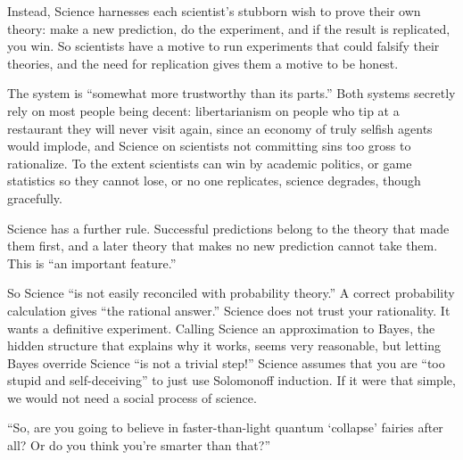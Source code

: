 Instead, Science harnesses each scientist's stubborn wish to prove their own theory: make a new prediction, do the experiment, and if the result is replicated, you win. So scientists have a motive to run experiments that could falsify their theories, and the need for replication gives them a motive to be honest. 

The system is ``somewhat more trustworthy than its parts.'' Both systems secretly rely on most people being decent: libertarianism on people who tip at a restaurant they will never visit again, since an economy of truly selfish agents would implode, and Science on scientists not committing sins too gross to rationalize. To the extent scientists can win by academic politics, or game statistics so they cannot lose, or no one replicates, science degrades, though gracefully.

Science has a further rule. Successful predictions belong to the theory that made them first, and a later theory that makes no new prediction cannot take them. This is ``an important feature.'' 

So Science ``is not easily reconciled with probability theory.'' A correct probability calculation gives ``the rational answer.'' Science does not trust your rationality. It wants a definitive experiment. Calling Science an approximation to Bayes, the hidden structure that explains why it works, seems very reasonable, but letting Bayes override Science ``is not a trivial step!'' Science assumes that you are ``too stupid and self-deceiving'' to just use Solomonoff induction. If it were that simple, we would not need a social process of science.

``So, are you going to believe in faster-than-light quantum `collapse' fairies after all? Or do you think you're smarter than that?'' 
